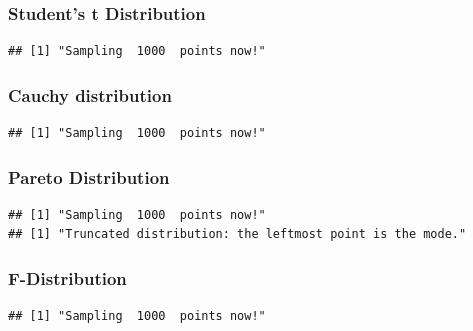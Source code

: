 \documentclass{article}\usepackage[]{graphicx}\usepackage[]{color}
\makeatletter
\newenvironment{kframe}{%
 \def\at@end@of@kframe{}%
 \ifinner\ifhmode%
  \def\at@end@of@kframe{\end{minipage}}%
  \begin{minipage}{\columnwidth}%
 \fi\fi%
 \def\FrameCommand##1{\hskip\@totalleftmargin \hskip-\fboxsep
 \colorbox{shadecolor}{##1}\hskip-\fboxsep
     \hskip-\linewidth \hskip-\@totalleftmargin \hskip\columnwidth}%
 \MakeFramed {\advance\hsize-\width
   \@totalleftmargin\z@ \linewidth\hsize
   \@setminipage}}%
 {\par\unskip\endMakeFramed%
 \at@end@of@kframe}
\newenvironment{knitrout}{}{} %
\makeatother
\begin{document}
\subsubsection{Student's t Distribution}
\begin{knitrout}
\color{fgcolor}\begin{kframe}
\begin{verbatim}
## [1] "Sampling  1000  points now!"
\end{verbatim}


{\ttfamily\noindent\bfseries\color{errorcolor}{\#\# Error in ars(t\_pdf, n, -50, 50): Bad density: not log-concave}}\end{kframe}
\end{knitrout}

\subsubsection{Cauchy distribution}
\begin{knitrout}
\color{fgcolor}\begin{kframe}
\begin{verbatim}
## [1] "Sampling  1000  points now!"
\end{verbatim}


{\ttfamily\noindent\bfseries\color{errorcolor}{\#\# Error in ars(cauchy\_pdf, n, -Inf, Inf): Bad density: not log-concave}}\end{kframe}
\end{knitrout}

\subsubsection{Pareto Distribution}
\begin{knitrout}
\color{fgcolor}\begin{kframe}
\begin{verbatim}
## [1] "Sampling  1000  points now!"
## [1] "Truncated distribution: the leftmost point is the mode."
\end{verbatim}


{\ttfamily\noindent\bfseries\color{errorcolor}{\#\# Error in ars(pareto\_pdf, n, 3, Inf): Bad density: not log-concave}}\end{kframe}
\end{knitrout}

\subsubsection{F-Distribution}
\begin{knitrout}
\color{fgcolor}\begin{kframe}
\begin{verbatim}
## [1] "Sampling  1000  points now!"
\end{verbatim}


{\ttfamily\noindent\bfseries\color{errorcolor}{\#\# Error in ars(f\_pdf, n, 1e-05): Bad density: not log-concave}}\end{kframe}
\end{knitrout}
\end{document}
